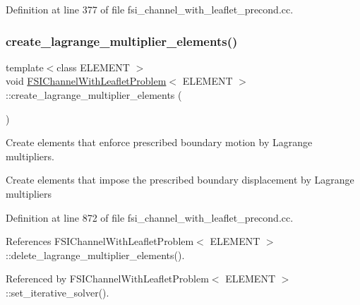 Definition at line 377 of file fsi\+\_\+channel\+\_\+with\+\_\+leaflet\+\_\+precond.\+cc.

\mbox{\label{classFSIChannelWithLeafletProblem_aa21f42ff019a517d94dbefdfc270c562}} 
\subsubsection{\texorpdfstring{create\+\_\+lagrange\+\_\+multiplier\+\_\+elements()}{create\_lagrange\_multiplier\_elements()}}
{\footnotesize\ttfamily template$<$class E\+L\+E\+M\+E\+NT $>$ \\
void \hyperlink{classFSIChannelWithLeafletProblem}{F\+S\+I\+Channel\+With\+Leaflet\+Problem}$<$ E\+L\+E\+M\+E\+NT $>$\+::create\+\_\+lagrange\+\_\+multiplier\+\_\+elements (\begin{DoxyParamCaption}{ }\end{DoxyParamCaption})}



Create elements that enforce prescribed boundary motion by Lagrange multipliers. 

Create elements that impose the prescribed boundary displacement by Lagrange multipliers 

Definition at line 872 of file fsi\+\_\+channel\+\_\+with\+\_\+leaflet\+\_\+precond.\+cc.



References F\+S\+I\+Channel\+With\+Leaflet\+Problem$<$ E\+L\+E\+M\+E\+N\+T $>$\+::delete\+\_\+lagrange\+\_\+multiplier\+\_\+elements().



Referenced by F\+S\+I\+Channel\+With\+Leaflet\+Problem$<$ E\+L\+E\+M\+E\+N\+T $>$\+::set\+\_\+iterative\+\_\+solver().

\mbox{\label{classFSIChannelWithLeafletProblem_aeab2d2d99741e64d83792003db758c38}} 
